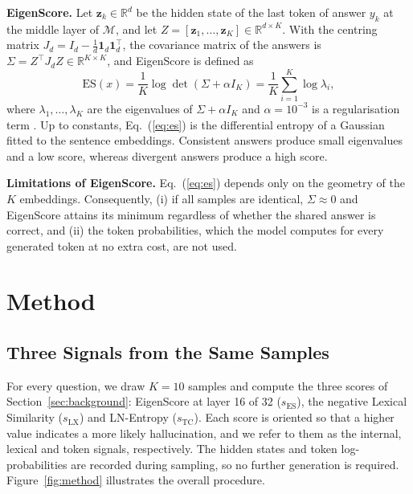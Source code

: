\documentclass[10pt]{article}
\newcommand{\sES}{s_{\mathrm{ES}}}
\newcommand{\sLX}{s_{\mathrm{LX}}}
\newcommand{\sTC}{s_{\mathrm{TC}}}
\begin{document}
\textbf{EigenScore.} Let $\mathbf{z}_k\in\mathbb{R}^d$ be the hidden state of the last token of answer $y_k$ at the middle layer of $\mathcal{M}$, and let $Z=[\mathbf{z}_1,\dots,\mathbf{z}_K]\in\mathbb{R}^{d\times K}$. With the centring matrix $J_d=I_d-\frac1d\mathbf{1}_d\mathbf{1}_d^\top$, the covariance matrix of the answers is $\Sigma=Z^\top J_d Z\in\mathbb{R}^{K\times K}$, and EigenScore is defined as
\begin{equation}
\mathrm{ES}(x)=\frac{1}{K}\log\det\left(\Sigma+\alpha I_K\right)=\frac{1}{K}\sum_{i=1}^{K}\log\lambda_i ,
\label{eq:es}
\end{equation}
where $\lambda_1,\dots,\lambda_K$ are the eigenvalues of $\Sigma+\alpha I_K$ and $\alpha=10^{-3}$ is a regularisation term \citep{chen2024inside}. Up to constants, Eq.~(\ref{eq:es}) is the differential entropy of a Gaussian fitted to the sentence embeddings. Consistent answers produce small eigenvalues and a low score, whereas divergent answers produce a high score.

\textbf{Limitations of EigenScore.} Eq.~(\ref{eq:es}) depends only on the geometry of the $K$ embeddings. Consequently, (i) if all samples are identical, $\Sigma\approx 0$ and EigenScore attains its minimum regardless of whether the shared answer is correct, and (ii) the token probabilities, which the model computes for every generated token at no extra cost, are not used.

\section{Method}\label{sec:method}
\subsection{Three Signals from the Same Samples}
For every question, we draw $K=10$ samples and compute the three scores of Section~\ref{sec:background}: EigenScore at layer 16 of 32 ($\sES$), the negative Lexical Similarity ($\sLX$) and LN-Entropy ($\sTC$). Each score is oriented so that a higher value indicates a more likely hallucination, and we refer to them as the internal, lexical and token signals, respectively. The hidden states and token log-probabilities are recorded during sampling, so no further generation is required. Figure~\ref{fig:method} illustrates the overall procedure.
\end{document}
